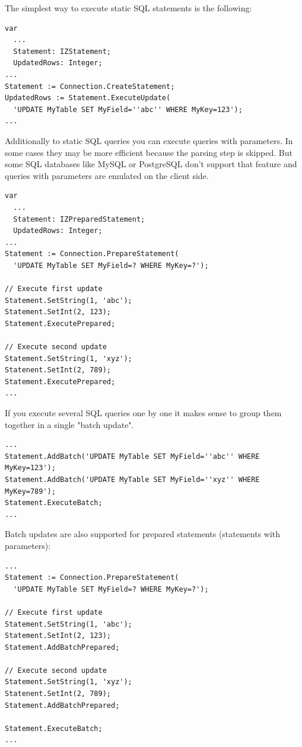 \documentclass[a4paper,12pt,oneside]{book}
\begin{document}
The simplest way to execute static SQL statements is the following:
\begin{verbatim}
var
  ...
  Statement: IZStatement;
  UpdatedRows: Integer;
...
Statement := Connection.CreateStatement;
UpdatedRows := Statement.ExecuteUpdate(
  'UPDATE MyTable SET MyField=''abc'' WHERE MyKey=123');
...
\end{verbatim}

Additionally to static SQL queries you can execute queries with parameters.
In some cases they may be more efficient because the parsing step is skipped.
But some SQL databases like MySQL or PostgreSQL don't support that feature and queries with parameters are emulated on the client side. 

\begin{verbatim}
var
  ...
  Statement: IZPreparedStatement;
  UpdatedRows: Integer;
...
Statement := Connection.PrepareStatement(
  'UPDATE MyTable SET MyField=? WHERE MyKey=?');

// Execute first update
Statement.SetString(1, 'abc');
Statement.SetInt(2, 123);
Statement.ExecutePrepared;

// Execute second update
Statement.SetString(1, 'xyz');
Statenent.SetInt(2, 789);
Statement.ExecutePrepared;
...
\end{verbatim}

If you execute several SQL queries one by one it makes sense to group them together in a single "batch update". 

\begin{verbatim}
...
Statement.AddBatch('UPDATE MyTable SET MyField=''abc'' WHERE MyKey=123');
Statement.AddBatch('UPDATE MyTable SET MyField=''xyz'' WHERE MyKey=789');
Statement.ExecuteBatch;
...
\end{verbatim}

Batch updates are also supported for prepared statements (statements with parameters): 

\begin{verbatim}
...
Statement := Connection.PrepareStatement(
  'UPDATE MyTable SET MyField=? WHERE MyKey=?');

// Execute first update
Statement.SetString(1, 'abc');
Statement.SetInt(2, 123);
Statement.AddBatchPrepared;

// Execute second update
Statement.SetString(1, 'xyz');
Statenent.SetInt(2, 789);
Statement.AddBatchPrepared;

Statement.ExecuteBatch;
...
\end{verbatim}
\end{document}
